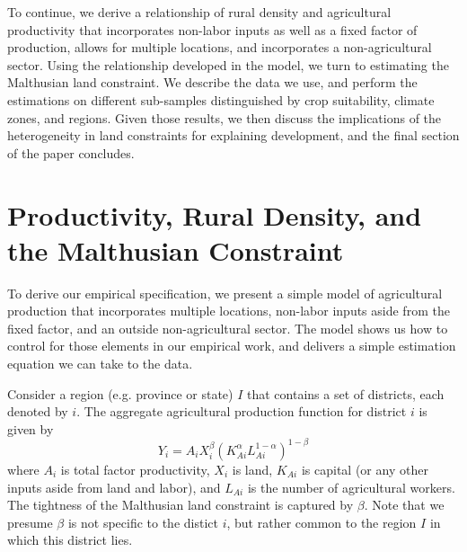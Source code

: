 \documentclass[11pt]{article}
\begin{document}
To continue, we derive a relationship of rural density and agricultural productivity that incorporates non-labor inputs as well as a fixed factor of production, allows for multiple locations, and incorporates a non-agricultural sector. Using the relationship developed in the model, we turn to estimating the Malthusian land constraint. We describe the data we use, and perform the estimations on different sub-samples distinguished by crop suitability, climate zones, and regions. Given those results, we then discuss the implications of the heterogeneity in land constraints for explaining development, and the final section of the paper concludes.

\section{Productivity, Rural Density, and the Malthusian Constraint}\label{SEC_agmodel}
To derive our empirical specification, we present a simple model of agricultural production that incorporates multiple locations, non-labor inputs aside from the fixed factor, and an outside non-agricultural sector. The model shows us how to control for those elements in our empirical work, and delivers a simple estimation equation we can take to the data. 

Consider a region (e.g. province or state) $I$ that contains a set of districts, each denoted by $i$. The aggregate agricultural production function for district $i$ is given by 
\begin{equation}
Y_{i} = A_{i} X_{i}^{\beta} \left(K_{Ai}^{\alpha}L_{Ai}^{1-\alpha}\right)^{1-\beta} \label{EQ_production}
\end{equation}
where $A_{i}$ is total factor productivity, $X_{i}$ is land, $K_{Ai}$ is capital (or any other inputs aside from land and labor), and $L_{Ai}$ is the number of agricultural workers. The tightness of the Malthusian land constraint is captured by $\beta$. Note that we presume $\beta$ is not specific to the distict $i$, but rather common to the region $I$ in which this district lies.
\end{document}
